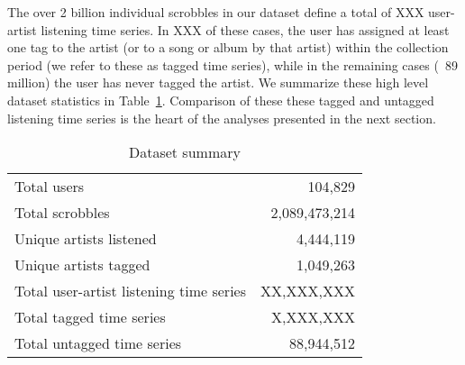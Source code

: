 The over 2 billion individual scrobbles in our dataset define a total of XXX user-artist listening time series. In XXX of these cases, the user has assigned at least one tag to the artist (or to a song or album by that artist) within the collection period (we refer to these as tagged time series), while in the remaining cases (~89 million) the user has never tagged the artist. We summarize these high level dataset statistics in Table~\ref{tab:data_summary}. Comparison of these these tagged and untagged listening time series is the heart of the analyses presented in the next section.

\begin{table}[h]
\begin{center}
\begin{tabular}{l|r}
\toprule
Total users & 104,829 \\
Total scrobbles & 2,089,473,214 \\
Unique artists listened & 4,444,119 \\
Unique artists tagged & 1,049,263 \\
\midrule
Total user-artist listening time series & XX,XXX,XXX \\
Total tagged time series & X,XXX,XXX \\
Total untagged time series & 88,944,512 \\
\bottomrule
\end{tabular}
\end{center}
\caption{Dataset summary}
\label{tab:data_summary}
\end{table}

